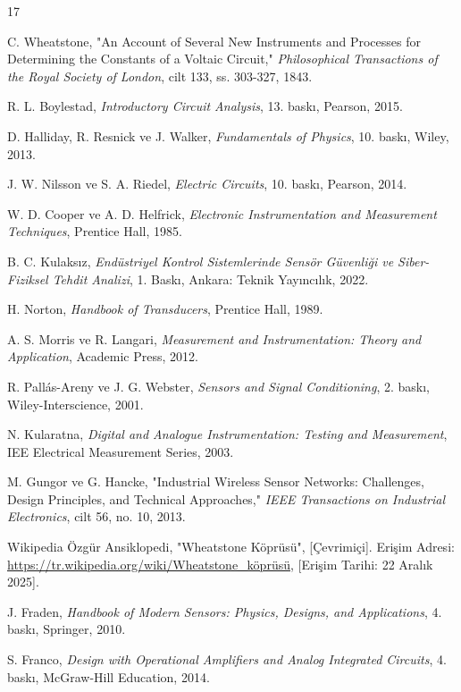 \documentclass[12pt,a4paper]{article}
\begin{document}
\newpage
\begin{thebibliography}{17}

 C. Wheatstone, "An Account of Several New Instruments and Processes for Determining the Constants of a Voltaic Circuit," \emph{Philosophical Transactions of the Royal Society of London}, cilt 133, ss. 303-327, 1843.

 R. L. Boylestad, \emph{Introductory Circuit Analysis}, 13. baskı, Pearson, 2015.

 D. Halliday, R. Resnick ve J. Walker, \emph{Fundamentals of Physics}, 10. baskı, Wiley, 2013.

 J. W. Nilsson ve S. A. Riedel, \emph{Electric Circuits}, 10. baskı, Pearson, 2014.

 W. D. Cooper ve A. D. Helfrick, \emph{Electronic Instrumentation and Measurement Techniques}, Prentice Hall, 1985.

 B. C. Kulaksız, \emph{Endüstriyel Kontrol Sistemlerinde Sensör Güvenliği ve Siber-Fiziksel Tehdit Analizi}, 1. Baskı, Ankara: Teknik Yayıncılık, 2022.

 H. Norton, \emph{Handbook of Transducers}, Prentice Hall, 1989.

 A. S. Morris ve R. Langari, \emph{Measurement and Instrumentation: Theory and Application}, Academic Press, 2012.

 R. Pallás-Areny ve J. G. Webster, \emph{Sensors and Signal Conditioning}, 2. baskı, Wiley-Interscience, 2001.

 N. Kularatna, \emph{Digital and Analogue Instrumentation: Testing and Measurement}, IEE Electrical Measurement Series, 2003.

 M. Gungor ve G. Hancke, "Industrial Wireless Sensor Networks: Challenges, Design Principles, and Technical Approaches," \emph{IEEE Transactions on Industrial Electronics}, cilt 56, no. 10, 2013.

 Wikipedia Özgür Ansiklopedi, "Wheatstone Köprüsü", [Çevrimiçi]. Erişim Adresi: \url{https://tr.wikipedia.org/wiki/Wheatstone_köprüsü}, [Erişim Tarihi: 22 Aralık 2025].

 J. Fraden, \emph{Handbook of Modern Sensors: Physics, Designs, and Applications}, 4. baskı, Springer, 2010.

S. Franco, \emph{Design with Operational Amplifiers and Analog Integrated Circuits}, 4. baskı, McGraw-Hill Education, 2014.


\end{thebibliography}
\end{document}

